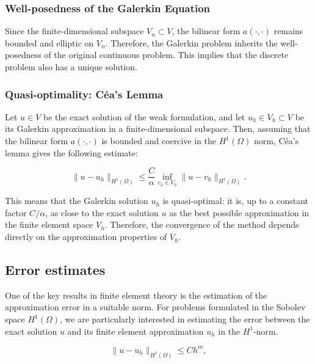 \documentclass[12pt]{article}
\begin{document}
\subsubsection*{Well-posedness of the Galerkin Equation}

Since the finite-dimensional subspace \( V_n \subset V \), the bilinear form \( a(\cdot, \cdot) \) remains bounded and elliptic on \( V_n \). Therefore, the Galerkin problem inherits the well-posedness of the original continuous problem. This implies that the discrete problem also has a unique solution.

\subsubsection*{Quasi-optimality: Céa's Lemma}

Let \( u \in V \) be the exact solution of the weak formulation, and let \( u_h \in V_h \subset V \) be its Galerkin approximation in a finite-dimensional subspace. Then, assuming that the bilinear form \( a(\cdot, \cdot) \) is bounded and coercive in the \( H^1(\Omega) \) norm, Céa's lemma gives the following estimate:

\begin{equation}
\| u - u_h \|_{H^1(\Omega)} \leq \frac{C}{\alpha} \inf_{v_h \in V_h} \| u - v_h \|_{H^1(\Omega)}.
\end{equation}

This means that the Galerkin solution \( u_h \) is quasi-optimal: it is, up to a constant factor \( C / \alpha \), as close to the exact solution \( u \) as the best possible approximation in the finite element space \( V_h \). Therefore, the convergence of the method depends directly on the approximation properties of \( V_h \).


\subsection{Error estimates}

One of the key results in finite element theory is the estimation of the approximation error in a suitable norm. For problems formulated in the Sobolev space \( H^1(\Omega) \), we are particularly interested in estimating the error between the exact solution \( u \) and its finite element approximation \( u_h \) in the \( H^1 \)-norm.

\begin{equation}
\| u - u_h \|_{H^1(\Omega)} \leq C h^m,
\end{equation}
\end{document}
